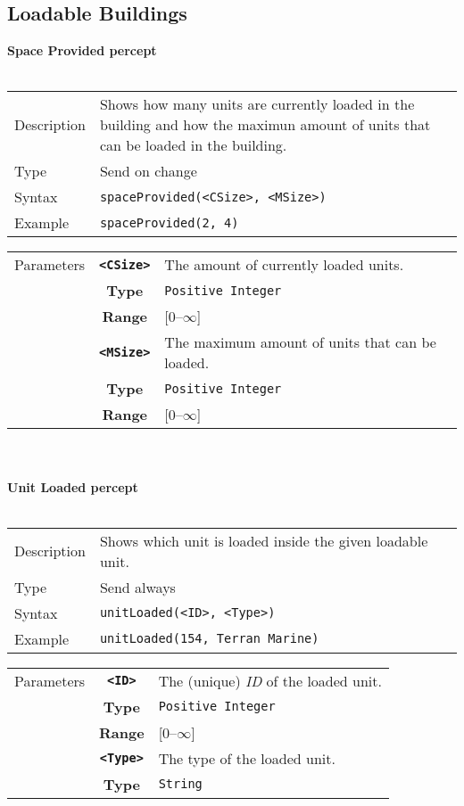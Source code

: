 \subsection{Loadable Buildings}
\textbf{Space Provided percept}\\
\\
\begin{tabularx}{\textwidth}{lX}
 Description & Shows how many units are currently loaded in the building and how the maximun amount of units that can be loaded in the building. \\
 Type & Send on change \\
 Syntax & \verb|spaceProvided(<CSize>, <MSize>)| \\
 Example & \verb|spaceProvided(2, 4)| \\
 \end{tabularx}
 \begin{tabularx}{\textwidth}{l | c | p{8cm}|}
 \cline{2-3}
 Parameters & \textbf{\verb|<CSize>|} & The amount of currently loaded units. \\
            & \textbf{Type} & \verb|Positive Integer| \\
            & \textbf{Range} & [0--$\infty$] \\
            \cline{2-3}
            & \textbf{\verb|<MSize>|} & The maximum amount of units that can be loaded. \\
            & \textbf{Type} & \verb|Positive Integer| \\
            & \textbf{Range} & [0--$\infty$] \\
            \cline{2-3}
\end{tabularx}\\
\\
\noindent
\textbf{Unit Loaded percept}\\
\\
\begin{tabularx}{\textwidth}{lX}
 Description & Shows which unit is loaded inside the given loadable unit.\\
 Type & Send always \\
 Syntax & \verb|unitLoaded(<ID>, <Type>)| \\
 Example & \verb|unitLoaded(154, Terran Marine)| \\
 \end{tabularx}
 \begin{tabularx}{\textwidth}{l | c | p{8cm}|}
 \cline{2-3}
 Parameters & \textbf{\verb|<ID>|} & The (unique) \textit{ID} of the loaded unit. \\
            & \textbf{Type} & \verb|Positive Integer| \\
            & \textbf{Range} & [0--$\infty$] \\
            \cline{2-3}
            & \textbf{\verb|<Type>|} & The type of the loaded unit. \\
            & \textbf{Type} & \verb|String| \\
            \cline{2-3}
\end{tabularx}\\


